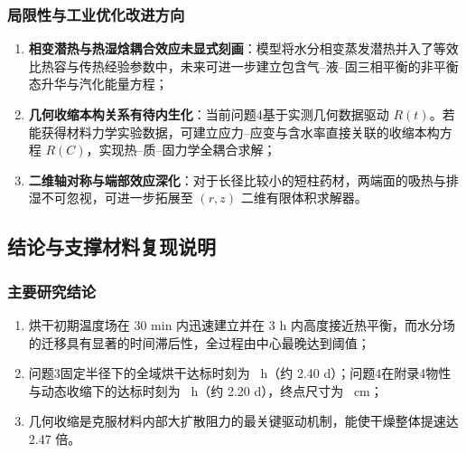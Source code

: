 \documentclass[12pt,a4paper]{ctexart}
\begin{document}
\subsubsection{局限性与工业优化改进方向}
\begin{enumerate}[label=(\arabic*)]
  \item \textbf{相变潜热与热湿焓耦合效应未显式刻画}：模型将水分相变蒸发潜热并入了等效比热容与传热经验参数中，未来可进一步建立包含气--液--固三相平衡的非平衡态升华与汽化能量方程；
  \item \textbf{几何收缩本构关系有待内生化}：当前问题4基于实测几何数据驱动 $R(t)$。若能获得材料力学实验数据，可建立应力--应变与含水率直接关联的收缩本构方程 $R(C)$，实现热--质--固力学全耦合求解；
  \item \textbf{二维轴对称与端部效应深化}：对于长径比较小的短柱药材，两端面的吸热与排湿不可忽视，可进一步拓展至 $(r,z)$ 二维有限体积求解器。
\end{enumerate}

\subsection{结论与支撑材料复现说明}
\subsubsection{主要研究结论}
\begin{enumerate}[label=(\arabic*)]
  \item 烘干初期温度场在 30 min 内迅速建立并在 3 h 内高度接近热平衡，而水分场的迁移具有显著的时间滞后性，全过程由中心最晚达到阈值；
  \item 问题3固定半径下的全域烘干达标时刻为 \QThreeDryHours\ h（约 2.40 d）；问题4在附录4物性与动态收缩下的达标时刻为 \QFourDryHours\ h（约 2.20 d），终点尺寸为 \QFourDryRadius\ cm；
  \item 几何收缩是克服材料内部大扩散阻力的最关键驱动机制，能使干燥整体提速达 2.47 倍。
\end{enumerate}
\end{document}
